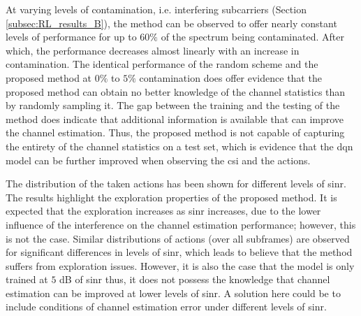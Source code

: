 At varying levels of contamination, i.e. interfering subcarriers (Section \ref{subsec:RL_results_B}), the method can be observed to offer nearly constant levels of performance for up to $60\%$ of the spectrum being contaminated. After which, the performance decreases almost linearly with an increase in contamination. The identical performance of the random scheme and the proposed method at $0\%$ to $5\%$ contamination does offer evidence that the proposed method can obtain no better knowledge of the channel statistics than by randomly sampling it. The gap between the training and the testing of the method does indicate that additional information is available that can improve the channel estimation. Thus, the proposed method is not capable of capturing the entirety of the channel statistics on a test set, which is evidence that the \gls{dqn} model can be further improved when observing the \gls{csi} and the actions. 

The distribution of the taken actions has been shown for different levels of \gls{sinr}. The results highlight the exploration properties of the proposed method. It is expected that the exploration increases as \gls{sinr} increases, due to the lower influence of the interference on the channel estimation performance; however, this is not the case. Similar distributions of actions (over all subframes) are observed for significant differences in levels of \gls{sinr}, which leads to believe that the method suffers from exploration issues. However, it is also the case that the model is only trained at $5$ dB of \gls{sinr} thus, it does not possess the knowledge that channel estimation can be improved at lower levels of \gls{sinr}. A solution here could be to include conditions of channel estimation error under different levels of \gls{sinr}.


